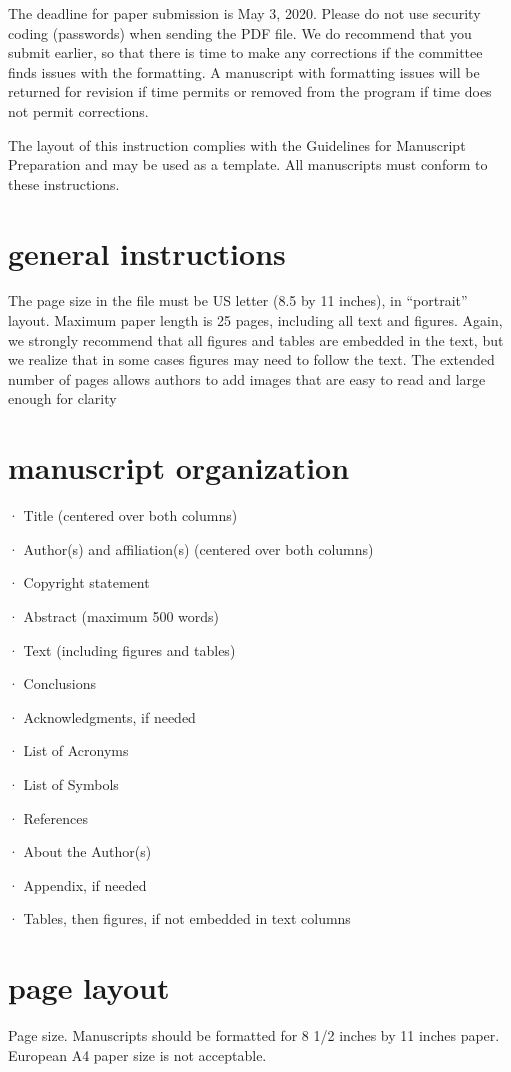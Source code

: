 \documentclass[10pt,twocolumn,twoside]{article}
\begin{document}
The deadline for paper submission is May 3, 2020. Please do not use security coding (passwords) when sending the PDF file. We do recommend that you submit earlier, so that there is time to make any corrections if the committee finds issues with the formatting. A manuscript with formatting issues will be returned for revision if time permits or removed from the program if time does not permit corrections.

The layout of this instruction complies with the Guidelines for Manuscript Preparation and may be used as a template. All manuscripts must conform to these instructions.

\section{general instructions}
The page size in the file must be US letter (8.5 by 11 inches), in “portrait” layout. Maximum paper length is 25 pages, including all text and figures. Again, we strongly recommend that all figures and tables are embedded in the text, but we realize that in some cases figures may need to follow the text. The extended number of pages allows authors to add images that are easy to read and large enough for clarity

\section{manuscript organization}
·	Title (centered over both columns)

·	Author(s) and affiliation(s) (centered over both columns)

·	Copyright statement

·	Abstract (maximum 500 words)

·	Text (including figures and tables)

·	Conclusions

·	Acknowledgments, if needed

·	List of Acronyms

·	List of Symbols

·	References

·	About the Author(s)

·	Appendix, if needed

·	Tables, then figures, if not embedded in text columns

\section{page layout}
Page size. Manuscripts should be formatted for 8 1/2 inches by 11 inches paper. European A4 paper size is not acceptable.
\end{document}

